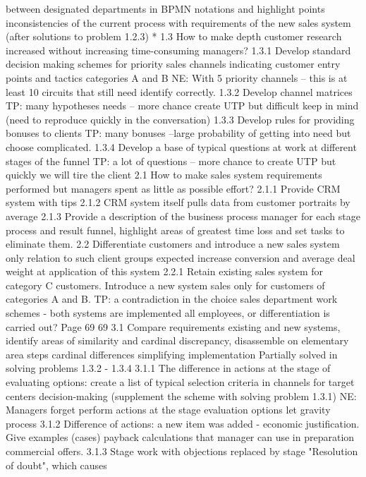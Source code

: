 between designated departments in
BPMN notations and highlight points
inconsistencies of the current process with
requirements of the new sales system (after
solutions to problem 1.2.3) *
1.3
How to make depth
customer research
increased without increasing
time-consuming managers?
1.3.1
Develop standard decision making schemes
for priority sales channels indicating
customer entry points and tactics
categories A and B
NE: With 5 priority
channels -- this is at least 10
circuits that still need
identify correctly.
1.3.2
Develop channel matrices
TP: many hypotheses
needs -- more chance
create UTP but difficult
keep in mind
(need to reproduce
quickly in the conversation)
1.3.3
Develop rules for providing bonuses
to clients
TP: many bonuses –large
probability of getting into
need but choose
complicated.
1.3.4
Develop a base of typical questions at work
at different stages of the funnel
TP: a lot of questions -- more
chance to create UTP but quickly
we will tire the client
2.1
How to make
sales system requirements
performed but managers
spent as little as possible
effort?
2.1.1
Provide CRM system with tips
2.1.2 CRM system itself pulls data from
customer portraits by average
2.1.3
Provide a description of the business process
manager for each stage
process and result funnel, highlight
areas of greatest time loss and
set tasks to eliminate them.
2.2
Differentiate
customers and introduce a new
sales system only
relation to such client
groups expected
increase conversion and
average deal weight at
application of this system
2.2.1
Retain existing sales system for
category C customers. Introduce a new system
sales only for customers of categories A and B.
TP: a contradiction in the choice
sales department work schemes
- both systems are implemented
all employees, or
differentiation is carried out?
Page 69
69
3.1
Compare requirements
existing and new systems,
identify areas of similarity and
cardinal discrepancy,
disassemble on
elementary area steps
cardinal differences
simplifying implementation
Partially solved in solving problems 1.3.2 -
1.3.4
3.1.1
The difference in actions at the stage of evaluating options:
create a list of typical selection criteria in
channels for target centers
decision-making (supplement the scheme with
solving problem 1.3.1)
NE: Managers forget
perform actions at the stage
evaluation options let
gravity process
3.1.2
Difference of actions: a new item was added -
economic justification. Give examples
(cases) payback calculations that
manager can use in preparation
commercial offers.
3.1.3
Stage work with objections replaced by stage
"Resolution of doubt", which causes

